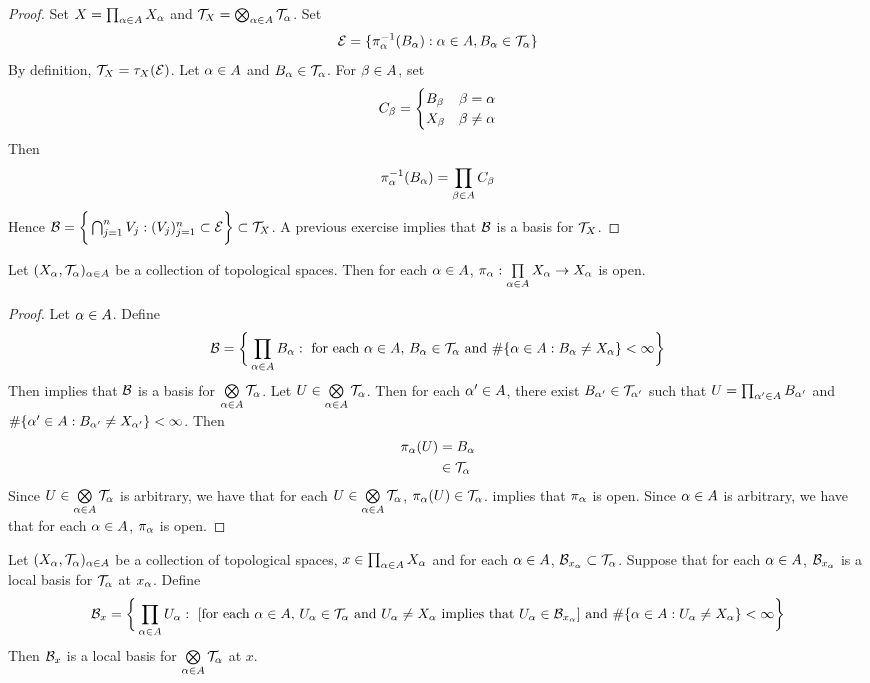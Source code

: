 \documentclass{book}
\begin{document}
	\begin{proof}
		Set $X = \prod_{\alpha \in A}X_{\alpha}$ and $\mathcal{T}_X = \bigotimes_{\alpha \in A} \mathcal{T}_{\alpha}$. Set 
		$$\mathcal{E} = \{\pi_{\alpha}^{-1}(B_{\alpha}): \alpha \in A, B_{\alpha} \in \mathcal{T}_{\alpha}\}$$ 
		By definition, $\mathcal{T}_{X} = \tau_{X}(\mathcal{E})$. Let $\alpha \in A$ and $B_{\alpha} \in \mathcal{T}_{\alpha}$. For $\beta \in A$, set 
		\[
		C_{\beta} = 
		\begin{cases}
			B_{\beta} & \beta = \alpha \\
			X_{\beta} & \beta \neq \alpha
		\end{cases}
		\]
		Then 
		\begin{align*}
			\pi_{\alpha}^{-1}(B_{\alpha}) = \prod_{\beta \in A} C_{\beta}  
		\end{align*}
		Hence $\mathcal{B} = \bigg \{\bigcap_{j=1}^n V_j:(V_j)_{j=1}^n \subset \mathcal{E} \bigg \} \subset \mathcal{T}_X$. A previous exercise implies that $\mathcal{B}$ is a basis for $\mathcal{T}_X$.
	\end{proof}

	\begin{ex} 
		Let $(X_{\alpha}, \mathcal{T}_{\alpha})_{\alpha \in A}$ be a collection of topological spaces. Then for each $\alpha \in A$, $\pi_{\alpha}: \prod\limits_{\alpha \in A} X_{\alpha} \rightarrow X_{\alpha}$ is open.
	\end{ex}

	\begin{proof}
		Let $\alpha \in A$. Define 
		$$\mathcal{B} = \bigg \{\prod_{\alpha \in A}B_{\alpha}: \text{ for each $\alpha \in A$,  $B_{\alpha} \in \mathcal{T}_{\alpha}$ and $\# \{\alpha \in A: B_{\alpha} \neq X_{\alpha}\} < \infty$} \bigg\}$$
		Then  implies that $\mathcal{B}$ is a basis for $\bigotimes\limits_{\alpha \in A} \mathcal{T}_{\alpha}$. Let $U \in \bigotimes\limits_{\alpha \in A} \mathcal{T}_{\alpha}$. Then for each $\alpha' \in A$, there exist $B_{\alpha'} \in \mathcal{T}_{\alpha'}$ such that $U = \prod_{\alpha' \in A}B_{\alpha'}$ and $\# \{\alpha' \in A: B_{\alpha'} \neq X_{\alpha'}\} < \infty$. Then 
		\begin{align*}
			\pi_{\alpha}(U)
			& = B_{\alpha} \\
			& \in \mathcal{T}_{\alpha}
		\end{align*}
		Since $U \in  \bigotimes\limits_{\alpha \in A} \mathcal{T}_{\alpha}$ is arbitrary, we have that for each $U \in  \bigotimes\limits_{\alpha \in A} \mathcal{T}_{\alpha}$, $\pi_{\alpha}(U) \in \mathcal{T}_{\alpha}$.  implies that $\pi_{\alpha}$ is open. Since $\alpha \in A$ is arbitrary, we have that for each $\alpha \in A$, $\pi_{\alpha}$ is open.
	\end{proof}

	\begin{ex}  
		Let $(X_{\alpha}, \mathcal{T}_{\alpha})_{\alpha \in A}$ be a collection of topological spaces, $x \in \prod_{\alpha \in A}X_{\alpha}$ and for each $\alpha \in A$, $\mathcal{B}_{x_{\alpha}} \subset \mathcal{T}_{\alpha}$. Suppose that for each $\alpha \in A$, $\mathcal{B}_{x_{\alpha}}$ is a local basis for $\mathcal{T}_{\alpha}$ at $x_{\alpha}$. Define 
		$$\mathcal{B}_x = \bigg \{\prod_{\alpha \in A} U_{\alpha}: \text{ [for each $\alpha \in A$, $U_{\alpha} \in \mathcal{T}_{\alpha}$ and $U_{\alpha} \neq X_{\alpha}$ implies that $U_{\alpha} \in \mathcal{B}_{x_{\alpha}}$] and $\# \{\alpha \in A: U_{\alpha} \neq X_{\alpha}\} < \infty$} \bigg\}$$
		Then $\mathcal{B}_x$ is a local basis for $\bigotimes\limits_{\alpha \in A} \mathcal{T}_{\alpha}$ at $x$.
	\end{ex}
\end{document}
